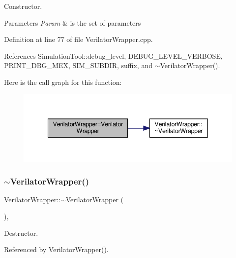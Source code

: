 Constructor. 


\begin{DoxyParams}{Parameters}
{\em Param} & is the set of parameters \\
\hline
\end{DoxyParams}


Definition at line 77 of file Verilator\+Wrapper.\+cpp.



References Simulation\+Tool\+::debug\+\_\+level, D\+E\+B\+U\+G\+\_\+\+L\+E\+V\+E\+L\+\_\+\+V\+E\+R\+B\+O\+SE, P\+R\+I\+N\+T\+\_\+\+D\+B\+G\+\_\+\+M\+EX, S\+I\+M\+\_\+\+S\+U\+B\+D\+IR, suffix, and $\sim$\+Verilator\+Wrapper().

Here is the call graph for this function\+:
\nopagebreak
\begin{figure}[H]
\begin{center}
\leavevmode
\includegraphics[width=342pt]{da/d8c/classVerilatorWrapper_ac1530972022e23dda9782f17a512b310_cgraph}
\end{center}
\end{figure}
\mbox{\label{classVerilatorWrapper_a0b67c3978509743ceee226ea10a9fcdd}} 
\subsubsection{\texorpdfstring{$\sim$\+Verilator\+Wrapper()}{~VerilatorWrapper()}}
{\footnotesize\ttfamily Verilator\+Wrapper\+::$\sim$\+Verilator\+Wrapper (\begin{DoxyParamCaption}{ }\end{DoxyParamCaption})\hspace{0.3cm}{\ttfamily [override]}, {\ttfamily [default]}}



Destructor. 



Referenced by Verilator\+Wrapper().

